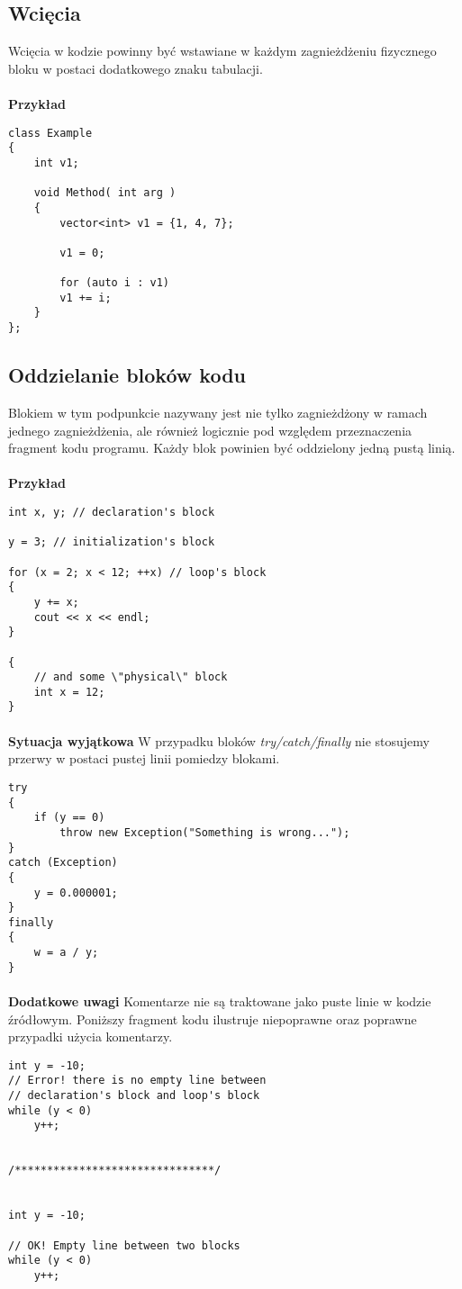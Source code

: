 \documentclass[titlepage]{article}
\begin{document}
\subsection{Wcięcia}
Wcięcia w kodzie powinny być wstawiane w każdym zagnieżdżeniu fizycznego bloku w postaci dodatkowego znaku tabulacji.
\paragraph{}
\textbf{Przykład}
\begin{lstlisting}
class Example
{
	int v1;

	void Method( int arg )
	{
		vector<int> v1 = {1, 4, 7};

		v1 = 0;

		for (auto i : v1)
		v1 += i;
	}
};
\end{lstlisting}

\subsection{Oddzielanie bloków kodu}
Blokiem w tym podpunkcie nazywany jest nie tylko zagnieżdżony w ramach jednego zagnieżdżenia, ale również logicznie pod względem przeznaczenia fragment kodu programu. Każdy blok powinien być oddzielony jedną pustą linią.
\paragraph{}
\textbf{Przykład}
\begin{lstlisting}
int x, y; // declaration's block

y = 3; // initialization's block

for (x = 2; x < 12; ++x) // loop's block
{
	y += x;
	cout << x << endl;
}

{
	// and some \"physical\" block
	int x = 12;
}
\end{lstlisting}
\paragraph{}
\textbf{Sytuacja wyjątkowa}
W przypadku bloków \textit{try/catch/finally} nie stosujemy przerwy w postaci pustej linii pomiedzy blokami.
\begin{lstlisting}
try
{
	if (y == 0)
		throw new Exception("Something is wrong...");
}
catch (Exception)
{
	y = 0.000001;
}
finally
{
	w = a / y;
}
\end{lstlisting}
\paragraph{}
\textbf{Dodatkowe uwagi}
Komentarze nie są traktowane jako puste linie w kodzie źródłowym. Poniższy fragment kodu ilustruje niepoprawne oraz poprawne przypadki użycia komentarzy.
\begin{lstlisting}
int y = -10;
// Error! there is no empty line between
// declaration's block and loop's block
while (y < 0)
	y++;


/*******************************/


int y = -10;

// OK! Empty line between two blocks
while (y < 0)
	y++;
\end{lstlisting}
\end{document}
